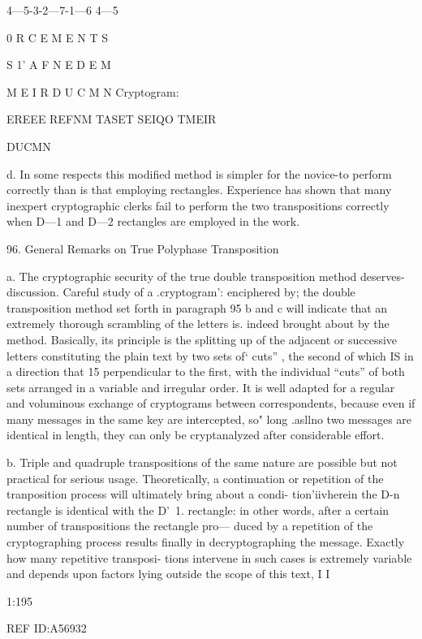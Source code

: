 4—5-3-2—7-1—6 4—5

0 R C E M E N T S

S 1' A F N E D E M

M E I R D U C M N
Cryptogram:

EREEE REFNM TASET SEIQO TMEIR

DUCMN

d. In some respects this modiﬁed method is simpler for the novice-to
perform correctly than is that employing rectangles. Experience has
shown that many inexpert cryptographic clerks fail to perform the two
transpositions correctly when D—1 and D—2 rectangles are employed
in the work.

96. General Remarks on True Polyphase Transposition

a. The cryptographic security of the true double transposition method
deserves-discussion. Careful study of a .cryptogram': enciphered by; the
double transposition method set forth in paragraph 95 b and c will
indicate that an extremely thorough scrambling of the letters is. indeed
brought about by the method. Basically, its principle is the splitting up
of the adjacent or successive letters constituting the plain text by two
sets of‘ cuts” , the second of which IS in a direction that 15 perpendicular
to the ﬁrst, with the individual “cuts” of both sets arranged in a
variable and irregular order. It is well adapted for a regular and
voluminous exchange of cryptograms between correspondents, because
even if many messages in the same key are intercepted, so" long .asllno
two messages are identical in length, they can only be cryptanalyzed
after considerable effort.

b. Triple and quadruple transpositions of the same nature are possible
but not practical for serious usage. Theoretically, a continuation or
repetition of the tranposition process will ultimately bring about a condi-
tion'iivherein the D-n rectangle is identical with the D'~1. rectangle: in
other words, after a certain number of transpositions the rectangle pro—
duced by a repetition of the cryptographing process results ﬁnally in
decryptographing the message. Exactly how many repetitive transposi-
tions intervene in such cases is extremely variable and depends upon
factors lying outside the scope of this text, I I

1:195

REF ID:A56932

